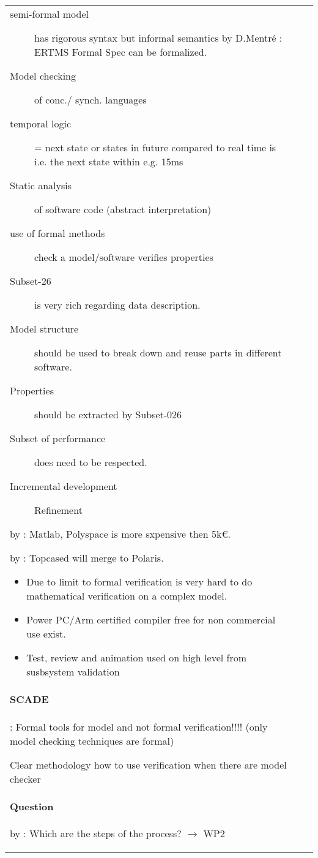 \documentclass[a4paper]{article}
\newcommand{\Q}[2]{\paragraph{Question} 
	\ifthenelse{\isempty{#1}}%
    	{}%
    	{by #1}%
    : #2}
\newcommand{\C}[2]{\newline{\textbf{Comment}}
	\ifthenelse{\isempty{#1}}%
    	{}%
    	{by #1}%
    : #2}
\begin{document}
\begin{longtable}{|p{}|p{}|p{}|}
\begin{description}
	\item [semi-formal model] has rigorous syntax but informal semantics
	\C{D.Mentr\'{e}}{ERTMS Formal Spec can be formalized.}
	\item [Model checking] of conc./ synch. languages
	\item [temporal logic] = next state or states in future \newline
	compared to real time is i.e. the next state within e.g. 15ms
	\item [Static analysis] of software code  (abstract interpretation)
	\item [use of formal methods] check a model/software verifies properties
	\item [Subset-26] is very rich regarding data description. \newline
	\item [Model structure] should be used to break down and reuse parts in different software.
	\item [Properties] should be extracted by Subset-026
	\item [Subset of performance] does need to be respected.
	\item [Incremental development] Refinement

\end{description}

\C{}{Matlab, Polyspace is more sxpensive then 5k\euro.}

\C{}{Topcased will merge to Polaris.}


\begin{itemize}
	\item Due to limit to formal verification is very hard to do mathematical verification on a complex model.
	\item Power PC/Arm certified compiler free for non commercial use exist.
	\item Test, review and animation used on high level from susbsystem validation
\end{itemize}

\paragraph{SCADE}: Formal tools for model and not formal verification!!!! (only  model checking techniques are formal)


Clear methodology how to use verification when there are model checker


\Q{}{Which are the steps of the process? $\rightarrow$ WP2}


\end{longtable}
\end{document}
